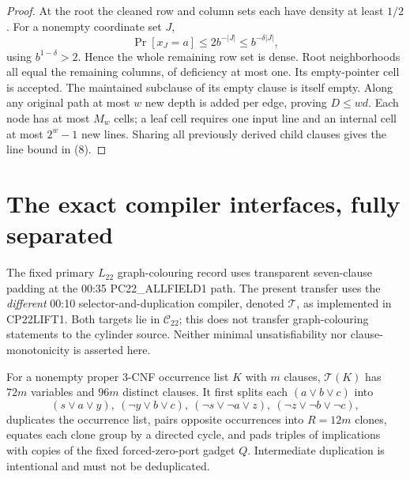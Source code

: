 \documentclass[11pt]{article}
\newcommand{\Cdom}{\mathcal C_{22}}
\newcommand{\Tcomp}{\mathcal T}
\begin{document}
\begin{proof}
At the root the cleaned row and column sets each have density at least
$1/2$. For a nonempty coordinate set $J$,
\[
 \Pr[x_J=a]\le2b^{-|J|}\le b^{-\delta|J|},
\]
using $b^{1-\delta}>2$. Hence the whole remaining row set is dense. Root
neighborhoods all equal the remaining columns, of deficiency at most one.
Its empty-pointer cell is accepted. The maintained subclause of its empty
clause is itself empty. Along any original path at most $w$ new depth is
added per edge, proving $D\le wd$. Each node has at most $M_w$ cells; a leaf
cell requires one input line and an internal cell at most $2^w-1$ new lines.
Sharing all previously derived child clauses gives the line bound in (8).
\end{proof}

\section{The exact compiler interfaces, fully separated}
The fixed primary $L_{22}$ graph-colouring record uses transparent
seven-clause padding at the 00:35 PC22\_ALLFIELD1 path. The present transfer
uses the \emph{different} 00:10 selector-and-duplication compiler, denoted
$\Tcomp$, as implemented in CP22LIFT1. Both targets lie in $\Cdom$; this does
not transfer graph-colouring statements to the cylinder source. Neither
minimal unsatisfiability nor clause-monotonicity is asserted here.

For a nonempty proper 3-CNF occurrence list $K$ with $m$ clauses,
$\Tcomp(K)$ has $72m$ variables and $96m$ distinct clauses. It first splits
each $(a\vee b\vee c)$ into
\[
 (s\vee a\vee y),\ (\neg y\vee b\vee c),\
 (\neg s\vee\neg a\vee z),\ (\neg z\vee\neg b\vee\neg c),
\]
duplicates the occurrence list, pairs opposite occurrences into $R=12m$
clones, equates each clone group by a directed cycle, and pads triples of
implications with copies of the fixed forced-zero-port gadget $Q$.
Intermediate duplication is intentional and must not be deduplicated.
\end{document}
